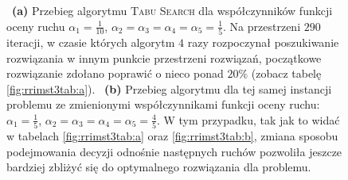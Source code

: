 \begin{figure}[!h]
{		~\textbf{(a)} Przebieg algorytmu \textsc{Tabu Search} dla współczynników funkcji oceny ruchu $\alpha_{1} = \frac{1}{10}$, $\alpha_{2} = \alpha_{3} = \alpha_{4} = \alpha_{5} = \frac{1}{5}$. Na przestrzeni $290$ iteracji, w czasie których algorytm $4$ razy rozpoczynał poszukiwanie rozwiązania w innym punkcie przestrzeni rozwiązań, początkowe rozwiązanie zdołano poprawić o nieco ponad $20\%$ (zobacz tabelę \ref{fig:rrimst3tab:a}).
		~\textbf{(b)} Przebieg algorytmu dla tej samej instancji problemu ze zmienionymi współczynnikami funkcji oceny ruchu: $\alpha_{1} = \frac{1}{5}$, $\alpha_{2} = \alpha_{3} = \alpha_{4} = \alpha_{5} = \frac{4}{5}$. W tym przypadku, tak jak to widać w tabelach \ref{fig:rrimst3tab:a} oraz \ref{fig:rrimst3tab:b}, zmiana sposobu podejmowania decyzji odnośnie następnych ruchów pozwoliła jeszcze bardziej zbliżyć się do optymalnego rozwiązania dla problemu.
	}
	\label{fig:rrimst3}
\end{figure}

